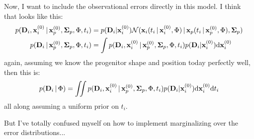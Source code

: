 \documentclass[letterpaper,12pt,preprint]{aastex}
\newcommand{\given}{\,|\,}
\newcommand{\dd}{\mathrm{d}}
\begin{document}
Now, I want to include the observational errors directly in this model. I think that looks like this:
\begin{align}
	p({\bf D}_i, {\bf x}_i^{(0)} \given {\bf x}_p^{(0)}, {\bf \Sigma}_p, \Phi, t_i) &= 
	p({\bf D}_i | {\bf x}_i^{(0)}) \mathcal{N}({\bf x}_i(t_i\given {\bf x}_i^{(0)}, \Phi ) \given {\bf x}_p(t_i\given {\bf x}_p^{(0)}, \Phi ), {\bf \Sigma}_p)\\
	p({\bf D}_i \given {\bf x}_p^{(0)}, {\bf \Sigma}_p, \Phi, t_i) &= \int p({\bf D}_i, {\bf x}_i^{(0)} \given {\bf x}_p^{(0)}, {\bf \Sigma}_p, \Phi, t_i)p({\bf D}_i | {\bf x}_i^{(0)}) \dd {\bf x}_i^{(0)}
\end{align}
again, assuming we know the progenitor shape and position today perfectly well, then this is:
\begin{align}
	p({\bf D}_i \given \Phi) &= \iint p({\bf D}_i, {\bf x}_i^{(0)} \given {\bf x}_p^{(0)}, {\bf \Sigma}_p, \Phi, t_i)p({\bf D}_i | {\bf x}_i^{(0)}) \dd {\bf x}_i^{(0)} \dd t_i\\
\end{align}
all along assuming a uniform prior on $t_i$.

But I've totally confused myself on how to implement marginalizing over the error distributions...
\end{document}
